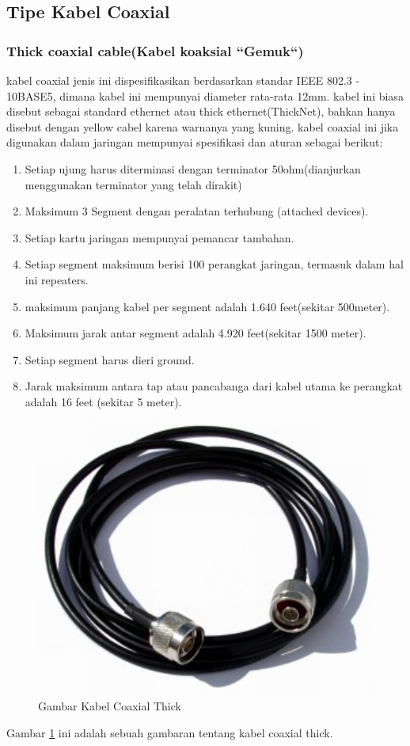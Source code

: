 \begin{itemize}
\subsection{Tipe Kabel Coaxial}
		\subsubsection{Thick coaxial cable(Kabel koaksial ``Gemuk``)}
		kabel coaxial jenis ini dispesifikasikan berdasarkan standar IEEE 802.3 - 10BASE5, dimana kabel ini mempunyai diameter rata-rata 12mm. kabel ini biasa disebut sebagai standard ethernet atau thick ethernet(ThickNet), bahkan hanya disebut dengan yellow cabel karena warnanya yang kuning.
		kabel coaxial ini jika digunakan dalam jaringan mempunyai spesifikasi dan aturan sebagai berikut:
			\begin{enumerate}
				\item Setiap ujung harus diterminasi dengan terminator 50ohm(dianjurkan menggunakan terminator yang telah dirakit)
				\item Maksimum 3 Segment dengan peralatan terhubung (attached devices).
				\item Setiap kartu jaringan mempunyai pemancar tambahan.
				\item Setiap segment maksimum berisi 100 perangkat jaringan, termasuk dalam hal ini repeaters.
				\item maksimum panjang kabel per segment adalah 1.640 feet(sekitar 500meter).
				\item Maksimum jarak antar segment adalah 4.920 feet(sekitar 1500 meter).
				\item Setiap segment harus dieri ground.
				\item Jarak maksimum antara tap atau pancabanga dari kabel utama ke perangkat adalah 16 feet (sekitar 5 meter).
			\end{enumerate}
\begin{figure} [ht]
	\centerline{\includegraphics[width=1\textwidth]{figures/thickcoax.jpg}}
	\caption{Gambar Kabel Coaxial Thick}
	\label{thickcoax}
\end{figure}
	Gambar \ref{thickcoax} ini adalah sebuah gambaran tentang kabel coaxial thick.
	

\end{itemize}
